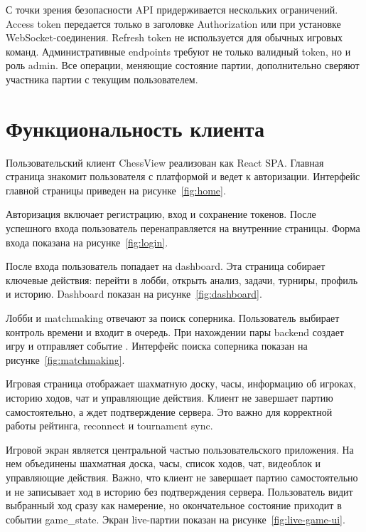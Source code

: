С точки зрения безопасности API придерживается нескольких ограничений. Access token передается только в заголовке Authorization или при установке WebSocket-соединения. Refresh token не используется для обычных игровых команд. Административные endpoints требуют не только валидный token, но и роль admin. Все операции, меняющие состояние партии, дополнительно сверяют участника партии с текущим пользователем.

\section{Функциональность клиента}

Пользовательский клиент ChessView реализован как React SPA. Главная страница знакомит пользователя с платформой и ведет к авторизации. Интерфейс главной страницы приведен на рисунке~\ref{fig:home}.


Авторизация включает регистрацию, вход и сохранение токенов. После успешного входа пользователь перенаправляется на внутренние страницы. Форма входа показана на рисунке~\ref{fig:login}.


После входа пользователь попадает на dashboard. Эта страница собирает ключевые действия: перейти в лобби, открыть анализ, задачи, турниры, профиль и историю. Dashboard показан на рисунке~\ref{fig:dashboard}.


Лобби и matchmaking отвечают за поиск соперника. Пользователь выбирает контроль времени и входит в очередь. При нахождении пары backend создает игру и отправляет событие . Интерфейс поиска соперника показан на рисунке~\ref{fig:matchmaking}.


Игровая страница отображает шахматную доску, часы, информацию об игроках, историю ходов, чат и управляющие действия. Клиент не завершает партию самостоятельно, а ждет подтверждение сервера. Это важно для корректной работы рейтинга, reconnect и tournament sync.


Игровой экран является центральной частью пользовательского приложения. На нем объединены шахматная доска, часы, список ходов, чат, видеоблок и управляющие действия. Важно, что клиент не завершает партию самостоятельно и не записывает ход в историю без подтверждения сервера. Пользователь видит выбранный ход сразу как намерение, но окончательное состояние приходит в событии game_state. Экран live-партии показан на рисунке~\ref{fig:live-game-ui}.

